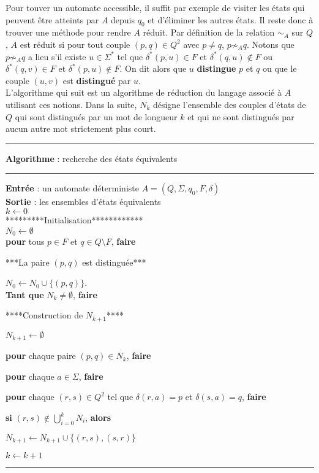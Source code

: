 \documentclass[11pt,a4paper]{article}\nofiles
\begin{document}
Pour touver un automate accessible, il suffit par exemple de visiter les \'etats qui peuvent \^etre atteints par $A$ depuis $q_0$ et d'\'eliminer les autres \'etats. 
Il reste donc \`a trouver une m\'ethode pour rendre $A$ r\'eduit. 
Par d\'efinition de la relation $\sim_A$ sur $Q$, $A$ est r\'eduit si pour tout couple $(p,q)\in Q^2$ avec $p\neq q$, $p\not \sim_A q$. 
Notons que $p\not \sim_A q$ a lieu s'il existe $u\in \Sigma^*$ tel que $\delta^*(p,u)\in F$ et $\delta^*(q,u)\notin F$ ou $\delta^*(q,v)\in F$ et $\delta^*(p,u)\notin F$. 
On dit alors que $u$ \textbf{distingue} $p$ et $q$ ou que le couple $(u,v)$ est \textbf{distingu\'e} par $u$.\\

L'algorithme qui suit est un algorithme de r\'eduction du langage associ\'e \`a $A$ utilisant ces notions. Dans la suite, $N_k$ d\'esigne l'ensemble des couples d'\'etats de $Q$ qui sont distingu\'es par un mot de longueur $k$ et qui ne sont distingu\'es par aucun autre mot strictement plus court.
\vskip3mm
\hrule
\vskip1mm
\textbf{Algorithme} : recherche des \'etats \'equivalents
\vskip1mm
\hrule

\textbf{Entr\'ee} : un automate d\'eterministe $A=(Q,\Sigma,q_0,F,\delta)$\\
\textbf{Sortie} : les ensembles d'\'etats \'equivalents\\

$k\leftarrow 0$\\
*********Initialisation************\\
$N_0\leftarrow \emptyset$\\
\textbf{pour} tous $p\in F$ et $q\in Q\setminus F$, \textbf{faire}\par
\hskip7mm ***La paire $(p,q)$ est distingu\'ee***\par
\hskip7mm $N_0\leftarrow N_0\cup\{(p,q)\}$.\\
\textbf{Tant que} $N_k\neq \emptyset$, \textbf{faire}\par
\hskip7mm ****Construction de $N_{k+1}$****\par
\hskip7mm $N_{k+1}\leftarrow \emptyset$\par
\hskip7mm \textbf{pour} chaque paire $(p,q)\in N_k$, \textbf{faire}\par
\hskip14mm \textbf{pour} chaque $a\in \Sigma$, \textbf{faire}\par
\hskip21mm \textbf{pour} chaque $(r,s)\in Q^2$ tel que $\delta(r,a)=p$ et $\delta(s,a)=q$, \textbf{faire}\par
\hskip28mm \textbf{si} $(r,s)\notin \bigcup_{i=0}^kN_i$, \textbf{alors}\par
\hskip35mm $N_{k+1}\leftarrow N_{k+1}\cup \{(r,s),(s,r)\}$\par
\hskip7mm $k\leftarrow k+1$
\vskip1mm
\hrule
\end{document}
